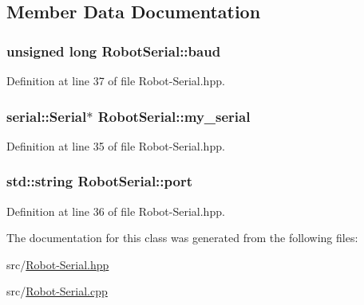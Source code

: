\subsection{Member Data Documentation}
\subsubsection[{\texorpdfstring{baud}{baud}}]{\setlength{\rightskip}{0pt plus 5cm}unsigned long Robot\+Serial\+::baud\hspace{0.3cm}{\ttfamily [private]}}\hypertarget{class_robot_serial_a43213d6b68c48365cbe869097fd84a84}{}\label{class_robot_serial_a43213d6b68c48365cbe869097fd84a84}


Definition at line 37 of file Robot-\/\+Serial.\+hpp.

\subsubsection[{\texorpdfstring{my\+\_\+serial}{my_serial}}]{\setlength{\rightskip}{0pt plus 5cm}serial\+::\+Serial$\ast$ Robot\+Serial\+::my\+\_\+serial\hspace{0.3cm}{\ttfamily [private]}}\hypertarget{class_robot_serial_a9341530abe93c48919dce7cd8cbc4312}{}\label{class_robot_serial_a9341530abe93c48919dce7cd8cbc4312}


Definition at line 35 of file Robot-\/\+Serial.\+hpp.

\subsubsection[{\texorpdfstring{port}{port}}]{\setlength{\rightskip}{0pt plus 5cm}std\+::string Robot\+Serial\+::port\hspace{0.3cm}{\ttfamily [private]}}\hypertarget{class_robot_serial_a6e9f213298488ef6699c3797f7d39a9d}{}\label{class_robot_serial_a6e9f213298488ef6699c3797f7d39a9d}


Definition at line 36 of file Robot-\/\+Serial.\+hpp.



The documentation for this class was generated from the following files\+:\begin{DoxyCompactItemize}
\item 
src/\hyperlink{_robot-_serial_8hpp}{Robot-\/\+Serial.\+hpp}\item 
src/\hyperlink{_robot-_serial_8cpp}{Robot-\/\+Serial.\+cpp}\end{DoxyCompactItemize}

